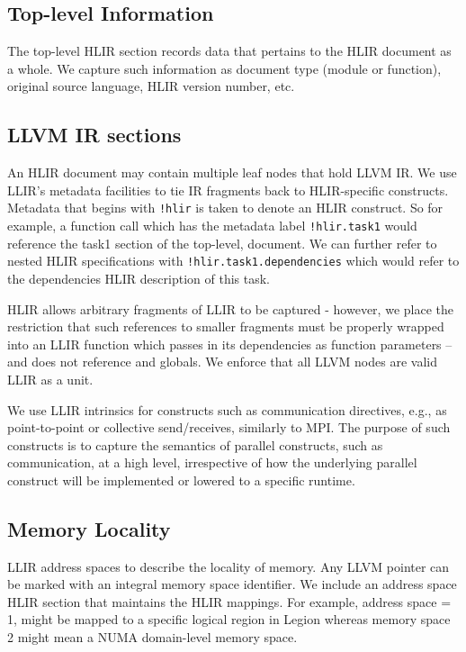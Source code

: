 \documentclass[12pt]{article}
\begin{document}
\subsection{Top-level Information}

The top-level HLIR section records data that pertains to the HLIR document as a whole. We capture such information as document type (module or function), original source language, HLIR version number, etc.

\subsection{LLVM IR sections}

An HLIR document may contain multiple leaf nodes that hold LLVM IR. We use LLIR's metadata facilities to tie IR fragments back to HLIR-specific constructs.
Metadata that begins with {\tt !hlir} is taken to denote an HLIR construct. So for example, a function call which has the metadata label {\tt !hlir.task1} would reference the task1 section of the top-level, document. We can further refer to nested HLIR specifications with {\tt !hlir.task1.dependencies} which would refer to the dependencies HLIR description of this task.

HLIR allows arbitrary fragments of LLIR to be captured - however, we place the restriction that such references to smaller fragments must be properly wrapped into an LLIR function which passes in its dependencies as function parameters -- and does not reference and globals. We enforce that all LLVM nodes are valid LLIR as a unit.

We use LLIR intrinsics for constructs such as communication directives, e.g., as point-to-point or collective send/receives, similarly to MPI. The purpose of such constructs is to capture the semantics of parallel constructs, such as communication, at a high level, irrespective of how the underlying parallel construct will be implemented or lowered to a specific runtime.

\subsection{Memory Locality}

LLIR address spaces to describe the locality of memory. Any LLVM pointer can be marked with an integral memory space identifier. We include an address space HLIR section that maintains the HLIR mappings. For example, address space = 1, might be mapped to a specific logical region in Legion whereas memory space 2 might mean a NUMA domain-level memory space.
\end{document}
